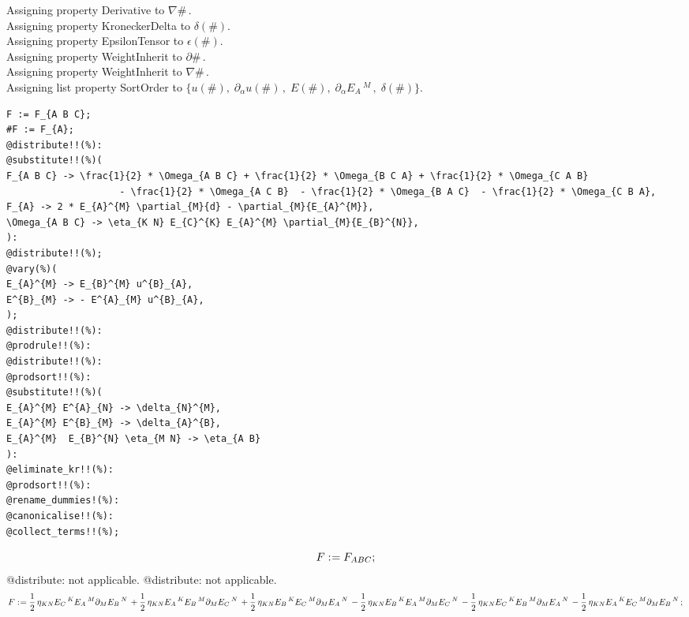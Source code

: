 \documentclass[11pt]{article}
\def\specialcolon{\mathrel{\mathop{:}}\hspace{-.5em}}
\begin{document}
Assigning property Derivative to $\nabla{\#}\, $.
\\
Assigning property KroneckerDelta to $\delta(\#)$.
\\
Assigning property EpsilonTensor to $\epsilon(\#)$.
\\
Assigning property WeightInherit to $\partial{\#}\, $.
\\
Assigning property WeightInherit to $\nabla{\#}\, $.
\\
Assigning list property SortOrder to $\{u(\#),\; {\partial}_{\alpha}{u(\#)}\, ,\; E(\#),\; {\partial}_{\alpha}{{E}_{A}\,^{M}}\, ,\; \delta(\#)\}$.
\\
{\color[named]{Blue}\begin{verbatim}
F := F_{A B C};
#F := F_{A};
@distribute!!(%):
@substitute!!(%)(
F_{A B C} -> \frac{1}{2} * \Omega_{A B C} + \frac{1}{2} * \Omega_{B C A} + \frac{1}{2} * \Omega_{C A B}
                    - \frac{1}{2} * \Omega_{A C B}  - \frac{1}{2} * \Omega_{B A C}  - \frac{1}{2} * \Omega_{C B A},
F_{A} -> 2 * E_{A}^{M} \partial_{M}{d} - \partial_{M}{E_{A}^{M}},
\Omega_{A B C} -> \eta_{K N} E_{C}^{K} E_{A}^{M} \partial_{M}{E_{B}^{N}},
):
@distribute!!(%);
@vary(%)(
E_{A}^{M} -> E_{B}^{M} u^{B}_{A},
E^{B}_{M} -> - E^{A}_{M} u^{B}_{A},
);
@distribute!!(%):
@prodrule!!(%):
@distribute!!(%):
@prodsort!!(%):
@substitute!!(%)(
E_{A}^{M} E^{A}_{N} -> \delta_{N}^{M},
E_{A}^{M} E^{B}_{M} -> \delta_{A}^{B},
E_{A}^{M}  E_{B}^{N} \eta_{M N} -> \eta_{A B}
):
@eliminate_kr!!(%):
@prodsort!!(%):
@rename_dummies!(%):
@canonicalise!!(%):
@collect_terms!!(%);
\end{verbatim}}
\begin{dmath*}[compact, spread=2pt]
F\specialcolon{}= {F}_{A B C};
\end{dmath*}
@distribute: not applicable.
@distribute: not applicable.
\begin{dmath*}[compact, spread=2pt]
F\specialcolon{}= \frac{1}{2}\, {\eta}_{K N} {E}_{C}\,^{K} {E}_{A}\,^{M} {\partial}_{M}{{E}_{B}\,^{N}}\,  + \frac{1}{2}\, {\eta}_{K N} {E}_{A}\,^{K} {E}_{B}\,^{M} {\partial}_{M}{{E}_{C}\,^{N}}\,  + \frac{1}{2}\, {\eta}_{K N} {E}_{B}\,^{K} {E}_{C}\,^{M} {\partial}_{M}{{E}_{A}\,^{N}}\,  - \frac{1}{2}\, {\eta}_{K N} {E}_{B}\,^{K} {E}_{A}\,^{M} {\partial}_{M}{{E}_{C}\,^{N}}\,  - \frac{1}{2}\, {\eta}_{K N} {E}_{C}\,^{K} {E}_{B}\,^{M} {\partial}_{M}{{E}_{A}\,^{N}}\,  - \frac{1}{2}\, {\eta}_{K N} {E}_{A}\,^{K} {E}_{C}\,^{M} {\partial}_{M}{{E}_{B}\,^{N}}\, ;
\end{dmath*}
\end{document}
